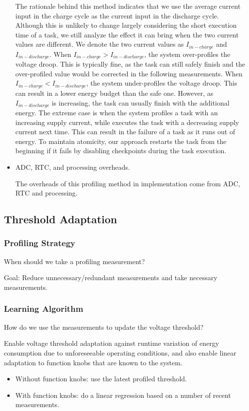 \begin{itemize}
    The rationale behind this method indicates that we use the average current input in the charge cycle as the current input in the discharge cycle. 
    Although this is unlikely to change largely considering the short execution time of a task, we still analyze the effect it can bring when the two current values are different. 
    We denote the two current values as $I_{in-charge}$ and $I_{in-discharge}$. 
    When $I_{in-charge} > I_{in-discharge}$, the system over-profiles the voltage droop. 
    This is typically fine, as the task can still safely finish and the over-profiled value would be corrected in the following measurements.
    When $I_{in-charge} < I_{in-discharge}$, the system under-profiles the voltage droop. 
    This can result in a lower energy budget than the safe one. 
    However, as $I_{in-discharge}$ is increasing, the task can usually finish with the additional energy. 
    The extreme case is when the system profiles a task with an increasing supply current, while executes the task with a decreasing supply current next time. 
    This can result in the failure of a task as it runs out of energy. 
    To maintain atomicity, our approach restarts the task from the beginning if it fails by disabling checkpoints during the task execution. 
    
    \item ADC, RTC, and processing overheads.
    
    The overheads of this profiling method in implementation come from ADC, RTC and processing.
\end{itemize}

\subsection{Threshold Adaptation}

\subsubsection{Profiling Strategy}

When should we take a profiling measurement?

Goal: Reduce unnecessary/redundant measurements and take necessary measurements.

\subsubsection{Learning Algorithm}

How do we use the measurements to update the voltage threshold?

Enable voltage threshold adaptation against runtime variation of energy consumption due to unforeseeable operating conditions, and also enable linear adaptation to function knobs that are known to the system. 

\begin{itemize}
    \item Without function knobs: use the latest profiled threshold.
    \item With function knobs: do a linear regression based on a number of recent measurements. 
\end{itemize}

